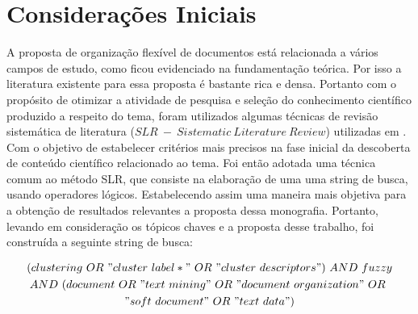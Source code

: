 %


\section{Considerações Iniciais}

A proposta de organização flexível de documentos está relacionada a vários campos de estudo, como
ficou evidenciado na fundamentação teórica. Por isso a literatura existente para essa proposta é
bastante rica e densa. Portanto com o propósito de otimizar a atividade de pesquisa e seleção do
conhecimento científico produzido a respeito do tema, foram utilizados algumas técnicas de revisão
sistemática de literatura ($SLR\ -\ Sistematic\ Literature\ Review$) utilizadas em \cite{Rios2010}.
Com o objetivo de estabelecer critérios mais precisos na fase inicial da descoberta de conteúdo
científico relacionado ao tema. Foi então adotada uma técnica comum ao método SLR, que consiste na
elaboração de uma uma string de busca, usando operadores lógicos. Estabelecendo assim uma maneira
mais objetiva para a obtenção de resultados relevantes a proposta dessa monografia.  Portanto,
levando em consideração os tópicos chaves e a proposta desse trabalho, foi construída a seguinte
string de busca: 

\begin{multline} (clustering\ OR\ "cluster\ label*"\ OR\ "cluster\ descriptors")\ AND\ fuzzy \\ AND\
  (document\ OR\ "text\ mining"\ OR\ "document\ organization"\ OR\ \\ "soft\ document"\ OR\ "text\
data") \label{eq:busca} \end{multline}

